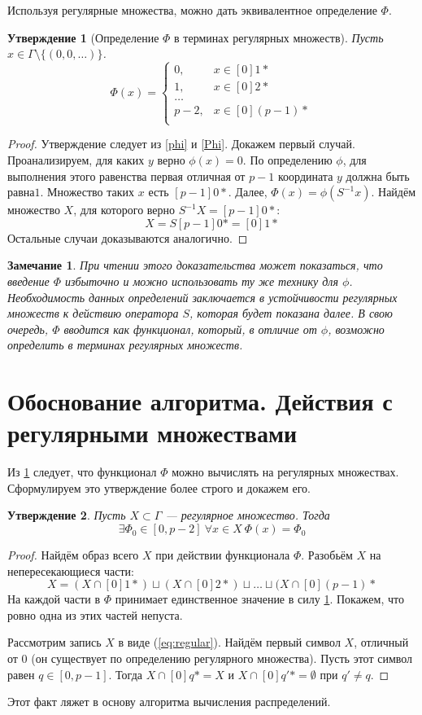\documentclass[14pt, a4paper, russian]{report}
\newtheorem{remark}{\indent Замечание}
\newtheorem{proposition}{\indent Утверждение}
\begin{document}
Используя регулярные множества, можно дать эквивалентное определение $\Phi$.
\begin{proposition}[Определение $\Phi$ в терминах регулярных множеств]\label{regular_sets}
Пусть $x \in \Gamma\setminus \{(0,0,\ldots)\}$.
$$ \Phi(x) = \begin{cases}
0, & x \in [0]1*\\
1, & x \in [0]2*\\
\ldots\\
p-2, & x \in [0](p-1)*\\
\end{cases}$$
\end{proposition}
\begin{proof}
Утверждение следует из \cref{phi} и \cref{Phi}.
Докажем первый случай. Проанализируем, для каких $y$ верно $\phi(x)=0$. По определению $\phi$, для выполнения этого равенства первая отличная от $p-1$ координата $y$ должна быть равна\nobreakspace$1$. Множество таких $x$ есть $[p-1]0*$. Далее, $\Phi(x) = \phi(S^{-1}x)$. Найдём множество $X$, для которого верно $S^{-1}X = [p-1]0*$:
$$X = S[p-1]0* = [0]1*$$ 
Остальные случаи доказываются аналогично.
\end{proof}
\begin{remark}
При чтении этого доказательства может показаться, что введение $\Phi$ избыточно и можно использовать ту же технику для $\phi$. Необходимость данных определений заключается в устойчивости регулярных множеств к действию оператора $S$, которая будет показана далее. В свою очередь, $\Phi$ вводится как функционал, который, в отличие от $\phi$, возможно определить в терминах регулярных множеств.
\end{remark}
\section{Обоснование алгоритма. Действия с регулярными множествами}
Из \cref{regular_sets} следует, что функционал $\Phi$ можно вычислять на регулярных множествах. Сформулируем это утверждение более строго и докажем его.
\begin{proposition}\label{Phi_for_regular}
Пусть $X \subset \Gamma$ --- регулярное множество. Тогда $$\exists \Phi_0 \in [0, p-2]\  \forall x \in X\ \Phi(x) = \Phi_0$$
\end{proposition}
\begin{proof}
Найдём образ всего $X$ при действии функционала $\Phi$. Разобьём $X$ на непересекающиеся части:
$$X = (X \cap [0]1*) \sqcup (X \cap [0]2*) \sqcup \ldots \sqcup (X \cap [0](p-1)* $$
На каждой части в $\Phi$ принимает единственное значение в силу \cref{regular_sets}. Покажем, что ровно одна из этих частей непуста.

Рассмотрим запись $X$ в виде (\ref{eq:regular}). Найдём первый символ $X$, отличный от $0$ (он существует по определению регулярного множества). Пусть этот символ равен $q \in [0, p-1]$. Тогда $X \cap [0]q* = X$ и $X \cap [0]q'* = \emptyset$ при $q' \ne q$.
\end{proof}
 Этот факт ляжет в основу алгоритма вычисления распределений.
\end{document}
